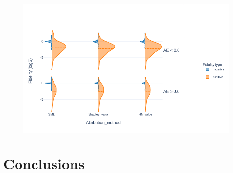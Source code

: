 \documentclass[twoside,twocolumn,9pt]{article}
\renewcommand{\refname}{Notes and references}
\begin{document}
\begin{figure}[H]
    \includegraphics[scale=0.35]{../data/images/esol_fidelity_distributions.png}
\end{figure}


\section{Conclusions}



\balance



\newpage
\appendix
{}
\renewcommand{\thesection}{A.\arabic{section}}
\end{document}
